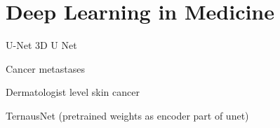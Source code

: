 \section{Deep Learning in Medicine}\label{deep_learning_medic_lit}
U-Net \cite{Ronneberger_Fischer_Brox_2015}
3D U Net \cite{Cicek_Abdulkadir_Lienkamp_Brox_Ronneberger_2016}

Cancer metastases \cite{Liu_Gadepalli_Norouzi_Dahl_Kohlberger_Boyko_Venugopalan_Timofeev_Nelson_Corrado_et_al_2017}

Dermatologist level skin cancer \cite{Esteva_Kuprel_Novoa_Ko_Swetter_Blau_Thrun_2017}

TernausNet (pretrained weights as encoder part of unet) \cite{Iglovikov_Shvets_2018}
